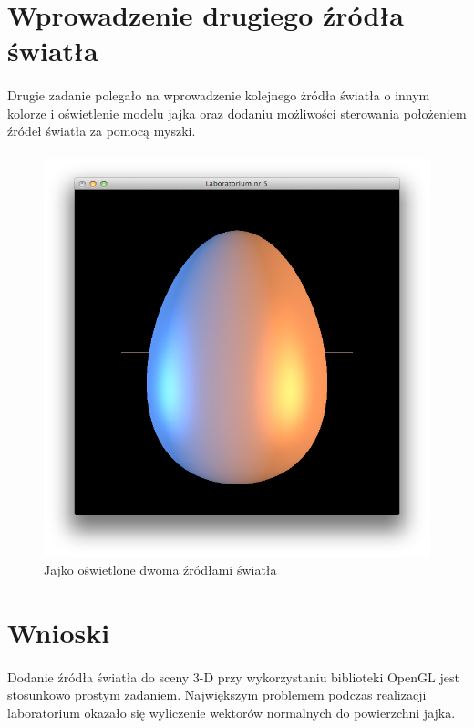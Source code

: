 \documentclass[wide,a4paper,titlepage,12pt] {article}
\begin{document}
  \section{Wprowadzenie drugiego źródła światła}
  \paragraph{}
  Drugie zadanie polegało na wprowadzenie kolejnego żródła światła o innym kolorze i oświetlenie modelu jajka oraz dodaniu możliwości sterowania położeniem źródeł światła za pomocą myszki.
  \paragraph{}
  

  \begin{figure}[h!]
    \begin{center}
      \includegraphics[width=\textwidth]{2.png}
      \caption{Jajko oświetlone dwoma źródłami światła}
    \end{center}
  \end{figure}

  \newpage
  \section{Wnioski}
  \paragraph{}
  Dodanie źródła światła do sceny 3-D przy wykorzystaniu biblioteki OpenGL jest stosunkowo prostym zadaniem. Największym problemem podczas realizacji laboratorium okazało się wyliczenie wektorów normalnych do powierzchni jajka.
\end{document}
